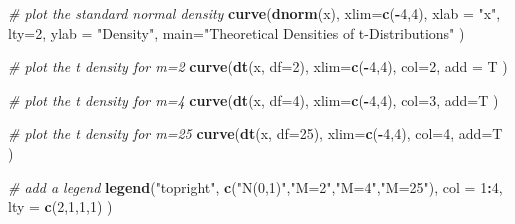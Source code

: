 \documentclass[]{book}
\newenvironment{Shaded}{\begin{snugshade}}{\end{snugshade}}
\newcommand{\KeywordTok}[1]{\textcolor[rgb]{0.13,0.29,0.53}{\textbf{#1}}}
\newcommand{\DataTypeTok}[1]{\textcolor[rgb]{0.13,0.29,0.53}{#1}}
\newcommand{\DecValTok}[1]{\textcolor[rgb]{0.00,0.00,0.81}{#1}}
\newcommand{\StringTok}[1]{\textcolor[rgb]{0.31,0.60,0.02}{#1}}
\newcommand{\CommentTok}[1]{\textcolor[rgb]{0.56,0.35,0.01}{\textit{#1}}}
\newcommand{\OperatorTok}[1]{\textcolor[rgb]{0.81,0.36,0.00}{\textbf{#1}}}
\newcommand{\NormalTok}[1]{#1}
\theoremstyle{definition}
\theoremstyle{definition}
\theoremstyle{definition}
\theoremstyle{remark}
\begin{document}
\begin{Shaded}
\begin{Highlighting}[]
\CommentTok{# plot the standard normal density}
\KeywordTok{curve}\NormalTok{(}\KeywordTok{dnorm}\NormalTok{(x), }
      \DataTypeTok{xlim=}\KeywordTok{c}\NormalTok{(}\OperatorTok{-}\DecValTok{4}\NormalTok{,}\DecValTok{4}\NormalTok{), }
      \DataTypeTok{xlab =} \StringTok{"x"}\NormalTok{, }
      \DataTypeTok{lty=}\DecValTok{2}\NormalTok{, }
      \DataTypeTok{ylab =} \StringTok{"Density"}\NormalTok{, }
      \DataTypeTok{main=}\StringTok{"Theoretical Densities of t-Distributions"}
\NormalTok{      )}

\CommentTok{# plot the t density for m=2}
\KeywordTok{curve}\NormalTok{(}\KeywordTok{dt}\NormalTok{(x, }\DataTypeTok{df=}\DecValTok{2}\NormalTok{), }
      \DataTypeTok{xlim=}\KeywordTok{c}\NormalTok{(}\OperatorTok{-}\DecValTok{4}\NormalTok{,}\DecValTok{4}\NormalTok{), }
      \DataTypeTok{col=}\DecValTok{2}\NormalTok{, }
      \DataTypeTok{add =}\NormalTok{ T}
\NormalTok{      )}

\CommentTok{# plot the t density for m=4}
\KeywordTok{curve}\NormalTok{(}\KeywordTok{dt}\NormalTok{(x, }\DataTypeTok{df=}\DecValTok{4}\NormalTok{), }
      \DataTypeTok{xlim=}\KeywordTok{c}\NormalTok{(}\OperatorTok{-}\DecValTok{4}\NormalTok{,}\DecValTok{4}\NormalTok{), }
      \DataTypeTok{col=}\DecValTok{3}\NormalTok{, }
      \DataTypeTok{add=}\NormalTok{T}
\NormalTok{      )}

\CommentTok{# plot the t density for m=25}
\KeywordTok{curve}\NormalTok{(}\KeywordTok{dt}\NormalTok{(x, }\DataTypeTok{df=}\DecValTok{25}\NormalTok{), }
      \DataTypeTok{xlim=}\KeywordTok{c}\NormalTok{(}\OperatorTok{-}\DecValTok{4}\NormalTok{,}\DecValTok{4}\NormalTok{), }
      \DataTypeTok{col=}\DecValTok{4}\NormalTok{, }
      \DataTypeTok{add=}\NormalTok{T}
\NormalTok{      )}

\CommentTok{# add a legend}
\KeywordTok{legend}\NormalTok{(}\StringTok{"topright"}\NormalTok{, }
       \KeywordTok{c}\NormalTok{(}\StringTok{"N(0,1)"}\NormalTok{,}\StringTok{"M=2"}\NormalTok{,}\StringTok{"M=4"}\NormalTok{,}\StringTok{"M=25"}\NormalTok{), }
       \DataTypeTok{col =} \DecValTok{1}\OperatorTok{:}\DecValTok{4}\NormalTok{, }
       \DataTypeTok{lty =} \KeywordTok{c}\NormalTok{(}\DecValTok{2}\NormalTok{,}\DecValTok{1}\NormalTok{,}\DecValTok{1}\NormalTok{,}\DecValTok{1}\NormalTok{)}
\NormalTok{       )}
\end{Highlighting}
\end{Shaded}
\end{document}
